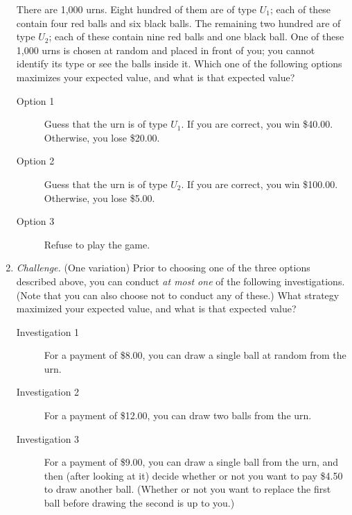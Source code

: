 \begin{enumerate}
There are 1,000 urns. Eight hundred of them are of type $U_1$; each of these contain four red balls and six black balls. The remaining two hundred are of type $U_2$; each of these contain nine red balls and one black ball. One of these 1,000 urns is chosen at random and placed in front of you; you cannot identify its type or see the balls inside it. Which one of the following options maximizes your expected value, and what is that expected value?
\begin{description}
\item[Option 1] Guess that the urn is of type $U_1$. If you are correct, you win \$40.00. Otherwise, you lose \$20.00.
\item[Option 2] Guess that the urn is of type $U_2$. If you are correct, you win \$100.00. Otherwise, you lose \$5.00.
\item[Option 3] Refuse to play the game.
\end{description}










\item \emph{Challenge.} (One variation) Prior to choosing one of the three options described above, you can conduct \emph{at most one} of the following investigations. (Note that you can also choose not to conduct any of these.) What strategy maximized your expected value, and what is that expected value?
\begin{description}
\item[Investigation 1] For a payment of \$8.00, you can draw a single ball at random from the urn. \item[Investigation 2] For a payment of \$12.00, you can draw two balls from the urn. \item[Investigation 3] For a payment of \$9.00, you can draw a single ball from the urn, and then (after looking at it) decide whether or not you want to pay \$4.50 to draw another ball. (Whether or not you want to replace the first ball before drawing the second is up to you.)
\end{description}











\end{enumerate}
